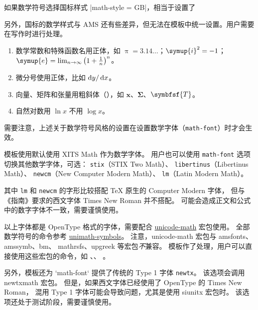 \documentclass[a4paper]{ltxdoc}
\makeatletter
\DeclareRobustCommand\pkg{\textsf}
\DeclareRobustCommand\opt{\texttt}
\def\DescribeOption{\leavevmode\@bsphack\begingroup\MakePrivateLetters
  \Describe@Option}
\def\Describe@Option#1{\endgroup
              \marginpar{\raggedleft\PrintDescribeOption{#1}}%
              \SpecialEnvIndex{#1}\@esphack\ignorespaces}
\makeatother
\begin{document}
如果数学符号选择国标样式 |math-style = GB|，相当于设置了
\begin{latex}
\end{latex}

另外，国标的数学样式与 AMS 还有些差异，但无法在模板中统一设置。用户需要在写作时进行处理。
\begin{enumerate}
  \item 数学常数和特殊函数名用正体，如 $\uppi = 3.14\dots$；$\symup{i}^2 = -1$；
    $\symup{e} = \lim_{n \to \infty} \left( 1 + \frac{1}{n} \right)^n$。
  \item 微分号使用正体，比如 $\mathop{}\!\mathrm{d} y / \mathop{}\!\mathrm{d} x$。
  \item 向量、矩阵和张量用粗斜体（），如 $\symbf{x}$、$\symbf{\Sigma}$、$\symbfsf{T}$。
  \item 自然对数用 $\ln x$ 不用 $\log x$。
\end{enumerate}

需要注意，上述关于数学符号风格的设置在设置数学字体（\opt{math-font}）时才会生效。

\DescribeOption{math-font}
模板使用默认使用 XITS Math 作为数学字体。
用户也可以使用 \opt{math-font} 选项切换其他数学字体，可选：
\opt{stix}（STIX Two Math）、
\opt{libertinus}（Libertinus Math）、
\opt{newcm}（New Computer Modern Math）、
\opt{lm}（Latin Modern Math）。

其中 \opt{lm} 和 \opt{newcm} 的字形比较搭配 TeX 原生的 Computer Modern 字体，
但与《指南》要求的西文字体 Times New Roman 并不搭配。
可能会造成正文和公式中的数字字体不一致，需要谨慎使用。

以上字体都是 OpenType 格式的字体，需要配合
\href{http://mirrors.ctan.org/macros/latex/contrib/unicode-math/unicode-math.pdf}{\pkg{unicode-math}}
宏包使用。
全部数学符号的命令参考
\href{http://mirrors.ctan.org/macros/latex/contrib/unicode-math/unimath-symbols.pdf}{\pkg{unimath-symbols}}。
注意，\pkg{unicode-math} 宏包与 \pkg{amsfonts}、\pkg{amssymb}、\pkg{bm}、
\pkg{mathrsfs}、\pkg{upgreek} 等宏包\emph{不}兼容。
模板作了处理，用户可以直接使用这些宏包的命令，如 、、
。

另外，模板还为 `math-font` 提供了传统的 Type 1 字体 \opt{newtx}。
该选项会调用 \pkg{newtxmath} 宏包。
但是，如果西文字体已经使用了 OpenType 的 Times New Roman，
混用 Type 1 字体可能会导致问题，尤其是使用 \pkg{siunitx} 宏包时。
该选项还处于测试阶段，需要谨慎使用。
\end{document}
